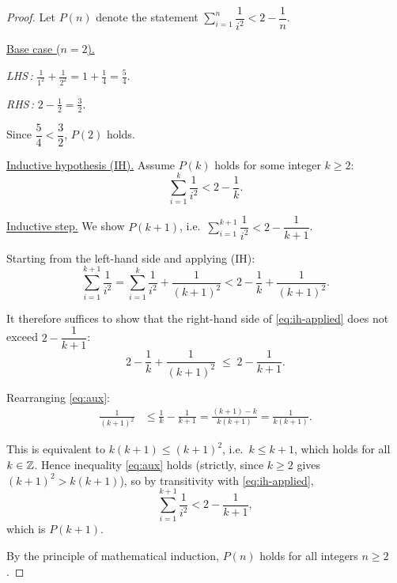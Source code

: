 \begin{proof}
Let $P(n)$ denote the statement
$\displaystyle\sum_{i=1}^{n} \dfrac{1}{i^2} < 2 - \dfrac{1}{n}$.

\bigskip
\noindent\underline{Base case ($n = 2$).}

\noindent\textit{LHS\,:}
$\displaystyle\frac{1}{1^2} + \frac{1}{2^2} = 1 + \frac{1}{4} = \frac{5}{4}$.

\noindent\textit{RHS\,:}
$\displaystyle 2 - \frac{1}{2} = \frac{3}{2}$.

Since $\dfrac{5}{4} < \dfrac{3}{2}$, $P(2)$ holds.

\bigskip
\noindent\underline{Inductive hypothesis (IH).}
Assume $P(k)$ holds for some integer $k \geq 2$:
\[
    \sum_{i=1}^{k} \frac{1}{i^2} < 2 - \frac{1}{k}. \tag{IH}
\]

\bigskip
\noindent\underline{Inductive step.}
We show $P(k+1)$, i.e.\
$\displaystyle\sum_{i=1}^{k+1} \dfrac{1}{i^2} < 2 - \dfrac{1}{k+1}$.

Starting from the left-hand side and applying (IH):
\begin{equation}\label{eq:ih-applied}
    \sum_{i=1}^{k+1} \frac{1}{i^2}
    = \sum_{i=1}^{k} \frac{1}{i^2} + \frac{1}{(k+1)^2}
    < 2 - \frac{1}{k} + \frac{1}{(k+1)^2}.
\end{equation}

It therefore suffices to show that the right-hand side of
\eqref{eq:ih-applied} does not exceed $2 - \dfrac{1}{k+1}$:
\begin{equation}\label{eq:aux}
    2 - \frac{1}{k} + \frac{1}{(k+1)^2} \;\leq\; 2 - \frac{1}{k+1}.
\end{equation}

Rearranging \eqref{eq:aux}:
\begin{align*}
    \frac{1}{(k+1)^2}
    &\leq \frac{1}{k} - \frac{1}{k+1}
     = \frac{(k+1) - k}{k(k+1)}
     = \frac{1}{k(k+1)}.
\end{align*}

This is equivalent to $k(k+1) \leq (k+1)^2$, i.e.\ $k \leq k+1$, which holds
for all $k \in \mathbb{Z}$. Hence inequality \eqref{eq:aux} holds (strictly, since
$k \geq 2$ gives $(k+1)^2 > k(k+1)$), so by transitivity with
\eqref{eq:ih-applied},
\[
    \sum_{i=1}^{k+1} \frac{1}{i^2}
    < 2 - \frac{1}{k+1},
\]
which is $P(k+1)$.

\bigskip
By the principle of mathematical induction, $P(n)$ holds for all integers
$n \geq 2$.
\end{proof}
